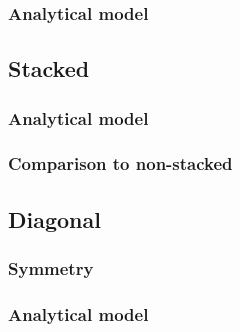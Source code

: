 \subsubsection{Analytical model}




\subsection{Stacked}

\subsubsection{Analytical model}

\subsubsection{Comparison to non-stacked}




\subsection{Diagonal}
\subsubsection{Symmetry}

\subsubsection{Analytical model}